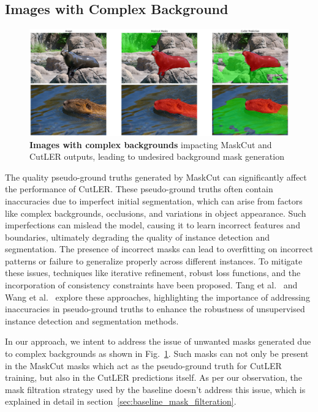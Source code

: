 \subsection{Images with Complex Background}
\begin{figure}
	\centering
	\includegraphics[width=1\textwidth]{Images/main/cutler-prob-noisy-bg.png}
	\caption[\textbf{Cutler's Performance on Images with Complex Background}]{\textbf{Images with complex backgrounds} impacting MaskCut and CutLER outputs, leading to undesired background mask generation}
	\label{fig:cutler_noisy_bg_eg}
\end{figure}

The quality pseudo-ground truths generated by MaskCut can significantly affect the performance of CutLER. These pseudo-ground truths often contain inaccuracies due to imperfect initial segmentation, which can arise from factors like complex backgrounds, occlusions, and variations in object appearance. Such imperfections can mislead the model, causing it to learn incorrect features and boundaries, ultimately degrading the quality of instance detection and segmentation. The presence of incorrect masks can lead to overfitting on incorrect patterns or failure to generalize properly across different instances. To mitigate these issues, techniques like iterative refinement, robust loss functions, and the incorporation of consistency constraints have been proposed. Tang et al.~\cite{Tang_2018_CVPR} and Wang et al.~\cite{ziegler2022selfsupervisedlearningobjectparts} explore these approaches, highlighting the importance of addressing inaccuracies in pseudo-ground truths to enhance the robustness of unsupervised instance detection and segmentation methods.

In our approach, we intent to address the issue of unwanted masks generated due to complex backgrounds as shown in Fig.~\ref{fig:cutler_noisy_bg_eg}. Such masks can not only be present in the MaskCut masks which act as the pseudo-ground truth for CutLER training, but also in the CutLER predictions itself. As per our observation, the mask filtration strategy used by the baseline doesn't address this issue, which is explained in detail in section~\ref{sec:baseline_mask_filteration}.

